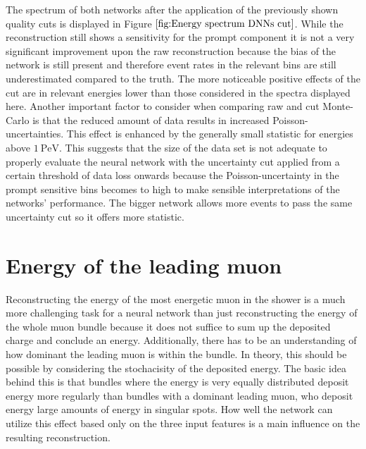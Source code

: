 \documentclass[
  tucolor,       %
  BCOR=12mm,     %
  parskip=half,  %
  open=any,      %
  cleardoublepage=plain,  %
]{tudothesis}
\begin{document}
The spectrum of both networks after the application of the previously shown quality cuts is displayed in Figure $\ref{fig:Energy spectrum DNNs cut}$.
While the reconstruction still shows a sensitivity for the prompt component it is not a very significant improvement upon the raw reconstruction because the bias of the network is still present and therefore event rates in the relevant bins are still underestimated compared to the truth.
The more noticeable positive effects of the cut are in relevant energies lower than those considered in the spectra displayed here.
Another important factor to consider when comparing raw and cut Monte-Carlo is that the reduced amount of data results in increased Poisson-uncertainties. 
This effect is enhanced by the generally small statistic for energies above $\SI{1}{\peta\electronvolt}$.
This suggests that the size of the data set is not adequate to properly evaluate the neural network with the uncertainty cut applied from a certain threshold of data loss onwards because the Poisson-uncertainty in the prompt sensitive bins becomes to high to make sensible interpretations of the networks' performance.
The bigger network allows more events to pass the same uncertainty cut so it offers more statistic.

\section{Energy of the leading muon}
Reconstructing the energy of the most energetic muon in the shower is a much more challenging task for a neural network than just reconstructing the energy of the whole muon bundle because it does not suffice to sum up the deposited charge and conclude an energy. 
Additionally, there has to be an understanding of how dominant the leading muon is within the bundle.
In theory, this should be possible by considering the stochacisity of the deposited energy.
The basic idea behind this is that bundles where the energy is very equally distributed deposit energy more regularly than bundles with a dominant leading muon, who deposit energy large amounts of energy in singular spots.
How well the network can utilize this effect based only on the three input features is a main influence on the resulting reconstruction.
\end{document}
